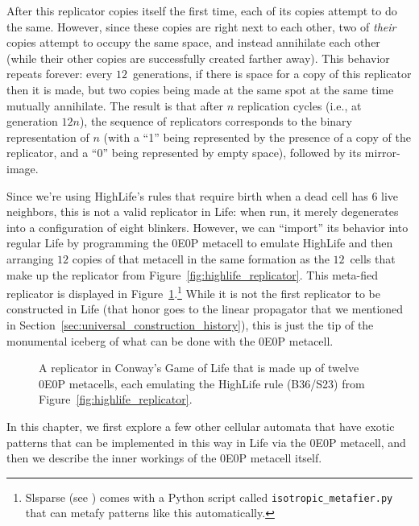 After this replicator copies itself the first time, each of its copies attempt to do the same. However, since these copies are right next to each other, two of \emph{their} copies attempt to occupy the same space, and instead annihilate each other (while their other copies are successfully created farther away). This behavior repeats forever: every $12$~generations, if there is space for a copy of this replicator then it is made, but two copies being made at the same spot at the same time mutually annihilate. The result is that after $n$ replication cycles (i.e., at generation $12n$), the sequence of replicators corresponds to the binary representation of $n$ (with a ``1'' being represented by the presence of a copy of the replicator, and a ``0'' being represented by empty space), followed by its mirror-image.

Since we're using HighLife's rules that require birth when a dead cell has $6$ live neighbors, this is not a valid replicator in Life: when run, it merely degenerates into a configuration of eight blinkers. However, we can ``import'' its behavior into regular Life by programming the 0E0P metacell to emulate HighLife and then arranging $12$ copies of that metacell in the same formation as the $12$~cells that make up the replicator from Figure~\ref{fig:highlife_replicator}. This meta-fied replicator is displayed in Figure~\ref{fig:meta_replicator}.\footnote{Slsparse (see ) comes with a Python script called \texttt{isotropic\_metafier.py} that can metafy patterns like this automatically.} While it is not the first replicator to be constructed in Life (that honor goes to the linear propagator that we mentioned in Section~\ref{sec:universal_construction_history}), this is just the tip of the monumental iceberg of what can be done with the 0E0P metacell.

\begin{figure}[!htb]
	\centering
	\caption{A replicator in Conway's Game of Life that is made up of twelve 0E0P metacells, each emulating the HighLife rule (B36/S23) from Figure~\ref{fig:highlife_replicator}.}\label{fig:meta_replicator}
\end{figure}

In this chapter, we first explore a few other cellular automata that have exotic patterns that can be implemented in this way in Life via the 0E0P metacell, and then we describe the inner workings of the 0E0P metacell itself.


